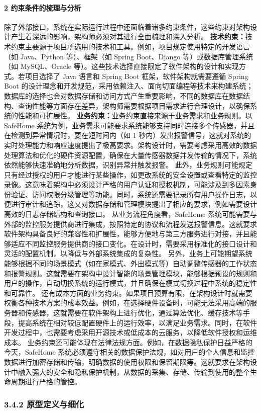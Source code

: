 \paragraph{2 约束条件的梳理与分析}\label{ux7ea6ux675fux6761ux4ef6ux7684ux68b3ux7406ux4e0eux5206ux6790} 除了外部接口，系统在实际运行过程中还面临着诸多约束条件，这些约束对架构设计产生着深远的影响，架构师必须对其进行全面梳理和深入分析。 \textbf{技术约束：}技术约束主要源于项目所选用的技术和工具。例如，项目规定使用特定的开发语言（如 Java、Python 等）、框架（如 Spring Boot、Django 等）或数据库管理系统（如 MySQL、Oracle 等）。这些技术选择直接限定了软件架构的设计和实现方式。若项目选择了 Java 语言和 Spring Boot 框架，软件架构就需要遵循 Spring Boot 的设计理念和开发规范，采用依赖注入、面向切面编程等技术来构建系统；数据库的选择也会对数据存储和访问方式产生重要影响，不同的数据库在数据结构、查询性能等方面存在差异，架构师需要根据项目需求进行合理设计，以确保系统的性能和可扩展性。 \textbf{业务约束：}业务约束直接来源于业务需求和业务规则。以 SafeHome 系统为例，业务需求可能要求系统能够支持同时连接多个传感器，并且在检测到异常情况时，要在短时间内（如 1 秒内）发出报警信号，这就对系统的实时处理能力和响应速度提出了极高要求。架构设计时，需要考虑采用高效的数据处理算法和优化的硬件资源配置，确保在大量传感器数据并发传输的情况下，系统依然能够快速准确地分析数据，识别异常并触发报警。 此外，业务规则可能规定只有经过授权的用户才能进行某些操作，如更改系统的安全设置或查看特定的监控录像。这意味着架构中必须设计严格的用户认证和授权机制，可能涉及到多因素身份验证、访问权限分级管理等功能。同时，系统还需要记录所有用户操作日志，以便进行审计和追踪，这又对数据存储和管理模块提出了相应的要求，例如需要设计高效的日志存储结构和查询接口。 从业务流程角度看，SafeHome 系统可能需要与外部的监控服务提供商进行集成，按照特定的协议和流程发送报警信息。这就要求软件架构具备良好的兼容性和扩展性，能够方便地与第三方服务进行对接，并且能够适应不同监控服务提供商的接口变化。在设计时，需要采用标准化的接口设计和灵活的配置机制，以降低与外部系统集成的复杂性。 另外，业务上可能期望系统能够根据不同的场景模式（如在家模式、外出模式等）自动调整传感器的工作状态和报警规则。这就需要在架构中设计智能的场景管理模块，能够根据预设的规则和用户的操作，自动切换系统的运行模式，并且确保在模式切换过程中系统的稳定性和可靠性。 还有成本方面的业务约束。如果项目预算有限，在架构设计时就需要权衡各种技术方案的成本效益。例如，在选择硬件设备时，可能无法采用高端的服务器和传感器，这就需要在软件架构上进行优化，通过算法优化、缓存技术等手段，提高系统在相对较低配置硬件上的运行效率，以满足业务需求。同时，在软件开发过程中，也需要考虑采用开源技术或低成本的云服务，以降低软件授权和运维成本。 业务约束还可能体现在法律法规方面。例如，在数据隐私保护日益严格的今天，SafeHome 系统必须遵守相关的数据保护法规，如对用户的个人信息和监控数据进行加密存储和传输，明确数据的使用权限和保留期限等。这就要求在架构设计中融入强大的安全和隐私保护机制，从数据的采集、存储、传输到使用的整个生命周期进行严格的管控。 \subsubsection{3.4.2 原型定义与细化}\label{ux539fux578bux5b9aux4e49ux4e0eux7ec6ux5316} 